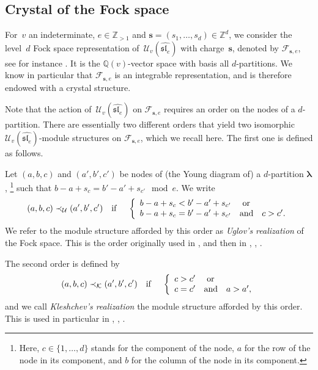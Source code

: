 \documentclass[twoside,12pt]{amsart}
\theoremstyle{plain}
\begin{document}
\subsection{Crystal of the Fock space}
\label{fockspace}

For~$v$ an indeterminate, $e\in{\mathbb{Z}}_{>1}$ and ${\mathbf{s}}=(s_1,\dots,s_d)\in{\mathbb{Z}}^d$, 
we consider the level~$d$ Fock space representation of~${\mathcal{U}_v (\widehat{\mathfrak{sl}_e})}$ with 
charge~${\mathbf{s}}$, denoted by ${\mathcal{F}}_{{\mathbf{s}},e}$, see for instance 
\cite[Chapter~6]{GeckJacon2011}. It is the ${\mathbb{Q}}(v)$-vector space with basis 
all $d$-partitions. We know in particular that ${\mathcal{F}}_{{\mathbf{s}},e}$ is an integrable 
representation, and is therefore endowed with a crystal structure.

Note that the action of~${\mathcal{U}_v (\widehat{\mathfrak{sl}_e})}$ on ${\mathcal{F}}_{{\mathbf{s}},e}$ requires an order on the 
nodes of a $d$-partition. There are essentially two different orders that 
yield two isomorphic ${\mathcal{U}_v (\widehat{\mathfrak{sl}_e})}$-module structures on ${\mathcal{F}}_{{\mathbf{s}},e}$, which we 
recall here. The first one is defined as follows. 

Let $(a,b,c)$ and $(a',b',c')$ be nodes of (the Young diagram of) a 
$d$-partition ${\boldsymbol{\lambda}}$,
\footnote{Here, $c\in\{1,\dots,d\}$ stands for the component of the node, 
$a$ for the row of the node in its component, and $b$ for the column of the node 
in its component.}
such that $b-a+s_c = b'-a'+s_{c'} \mod e$.
We write
$$(a,b,c)\prec_{\mathcal{U}} (a',b',c') \text{\quad if \quad} \left\{
\begin{array}{l}b-a+s_c < b'-a'+s_{c'} \text{ \quad or }\\ 
b-a+s_c = b'-a'+s_{c'} {\quad\text{and}\quad} c>c'.
\end{array}
\right.$$
We refer to the module structure afforded by this order as 
\textit{Uglov's realization} of the Fock space. This is the order originally 
used in \cite{JMMO1991}, and then in \cite{FLOTW1999}, \cite{Uglov1999}, 
\cite{GeckJacon2011}.

The second order is defined by
$$(a,b,c)\prec_{\mathcal{K}} (a',b',c') \text{\quad if \quad} \left\{
\begin{array}{l}c>c' \text{ \quad or }\\ 
c = c' {\quad\text{and}\quad} a > a',
\end{array}
\right.$$
and we call \textit{Kleshchev's realization} the module structure afforded by 
this order. This is used in particular in \cite{Ariki2002}, \cite{Mathas2004}, 
\cite{BrundanKleshchev2009}.
\end{document}
